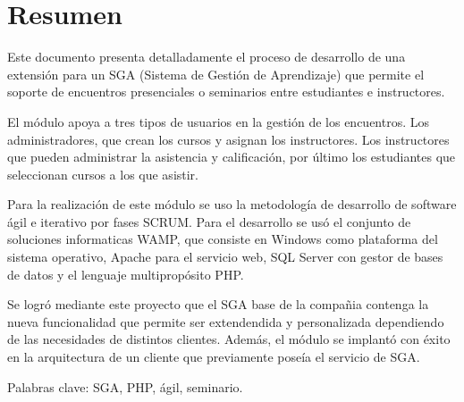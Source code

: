 \chapter*{Resumen}

Este documento presenta detalladamente el proceso de desarrollo de una extensión para un SGA (Sistema de Gestión de Aprendizaje) que permite el soporte de encuentros presenciales o seminarios entre estudiantes e instructores. 

El módulo apoya a tres tipos de usuarios en la gestión de los encuentros. Los administradores, que crean los cursos y asignan los instructores. Los instructores que pueden administrar la asistencia y calificación, por último los estudiantes que seleccionan cursos a los que asistir.

Para la realización de este módulo se uso la metodología de desarrollo de software ágil e iterativo por fases SCRUM. Para el desarrollo se usó el conjunto de soluciones informaticas WAMP, que consiste en Windows como plataforma del sistema operativo, Apache para el servicio web, SQL Server con gestor de bases de datos y el lenguaje multipropósito PHP.

Se logró mediante este proyecto que el SGA base de la compañia contenga la nueva funcionalidad que permite ser extendendida y personalizada dependiendo de las necesidades de distintos clientes. Además, el módulo se implantó con éxito en la arquitectura de un cliente que previamente poseía el servicio de SGA.

Palabras clave: SGA, PHP, ágil, seminario.




